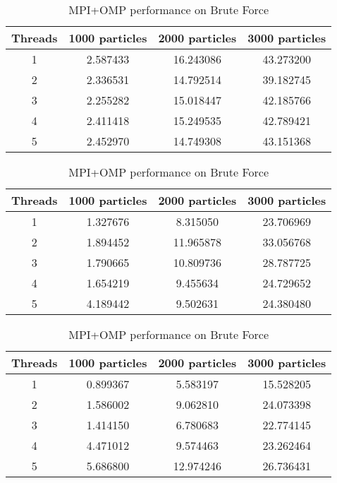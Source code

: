 \documentclass{scrartcl}
\begin{document}
\begin{center}
\begin{table}
\footnotesize
\centering
\begin{subtable}[c]{0.7\textwidth}
\centering
\begin{tabular}{cccc}
\hline
Threads& 1000 particles& 2000 particles& 3000 particles\\
\hline
1& 2.587433& 16.243086& 43.273200\\
2& 2.336531& 14.792514& 39.182745\\
3& 2.255282& 15.018447& 42.185766\\
4& 2.411418& 15.249535& 42.789421\\
5& 2.452970& 14.749308& 43.151368\\
\hline
\end{tabular}
\end{subtable}

\begin{subtable}[c]{0.7\textwidth}
\centering
\begin{tabular}{cccc}
\hline
Threads& 1000 particles& 2000 particles& 3000 particles\\
\hline
1& 1.327676& 8.315050& 23.706969\\
2& 1.894452& 11.965878& 33.056768\\
3& 1.790665& 10.809736& 28.787725\\
4& 1.654219& 9.455634& 24.729652\\
5& 4.189442& 9.502631& 24.380480\\
\hline
\end{tabular}
\end{subtable}

\begin{subtable}[c]{0.7\textwidth}
\centering
\begin{tabular}{cccc}
\hline
Threads& 1000 particles& 2000 particles& 3000 particles\\
\hline
1& 0.899367& 5.583197& 15.528205\\
2& 1.586002& 9.062810& 24.073398\\
3& 1.414150& 6.780683& 22.774145\\
4& 4.471012& 9.574463& 23.262464\\
5& 5.686800& 12.974246& 26.736431\\
\hline
\end{tabular}
\end{subtable}

\caption{MPI+OMP performance on Brute Force }
\end{table}
\end{center}
\end{document}
